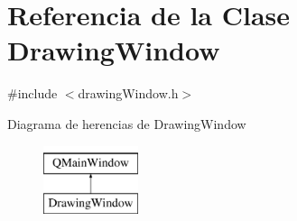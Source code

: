\hypertarget{class_drawing_window}{}\section{Referencia de la Clase Drawing\+Window}
\label{class_drawing_window}


{\ttfamily \#include $<$drawing\+Window.\+h$>$}

Diagrama de herencias de Drawing\+Window\begin{figure}[H]
\begin{center}
\leavevmode
\includegraphics[height=2.000000cm]{class_drawing_window}
\end{center}
\end{figure}
